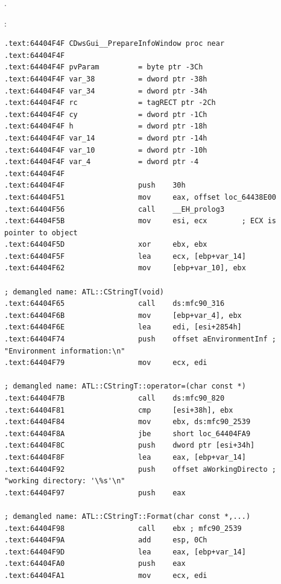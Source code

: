 .

:

\begin{lstlisting}
.text:64404F4F CDwsGui__PrepareInfoWindow proc near
.text:64404F4F
.text:64404F4F pvParam         = byte ptr -3Ch
.text:64404F4F var_38          = dword ptr -38h
.text:64404F4F var_34          = dword ptr -34h
.text:64404F4F rc              = tagRECT ptr -2Ch
.text:64404F4F cy              = dword ptr -1Ch
.text:64404F4F h               = dword ptr -18h
.text:64404F4F var_14          = dword ptr -14h
.text:64404F4F var_10          = dword ptr -10h
.text:64404F4F var_4           = dword ptr -4
.text:64404F4F
.text:64404F4F                 push    30h
.text:64404F51                 mov     eax, offset loc_64438E00
.text:64404F56                 call    __EH_prolog3
.text:64404F5B                 mov     esi, ecx        ; ECX is pointer to object
.text:64404F5D                 xor     ebx, ebx
.text:64404F5F                 lea     ecx, [ebp+var_14]
.text:64404F62                 mov     [ebp+var_10], ebx

; demangled name: ATL::CStringT(void)
.text:64404F65                 call    ds:mfc90_316    
.text:64404F6B                 mov     [ebp+var_4], ebx
.text:64404F6E                 lea     edi, [esi+2854h]
.text:64404F74                 push    offset aEnvironmentInf ; "Environment information:\n"
.text:64404F79                 mov     ecx, edi

; demangled name: ATL::CStringT::operator=(char const *)
.text:64404F7B                 call    ds:mfc90_820
.text:64404F81                 cmp     [esi+38h], ebx
.text:64404F84                 mov     ebx, ds:mfc90_2539
.text:64404F8A                 jbe     short loc_64404FA9
.text:64404F8C                 push    dword ptr [esi+34h]
.text:64404F8F                 lea     eax, [ebp+var_14]
.text:64404F92                 push    offset aWorkingDirecto ; "working directory: '\%s'\n"
.text:64404F97                 push    eax

; demangled name: ATL::CStringT::Format(char const *,...)
.text:64404F98                 call    ebx ; mfc90_2539
.text:64404F9A                 add     esp, 0Ch
.text:64404F9D                 lea     eax, [ebp+var_14]
.text:64404FA0                 push    eax
.text:64404FA1                 mov     ecx, edi


\end{lstlisting}
